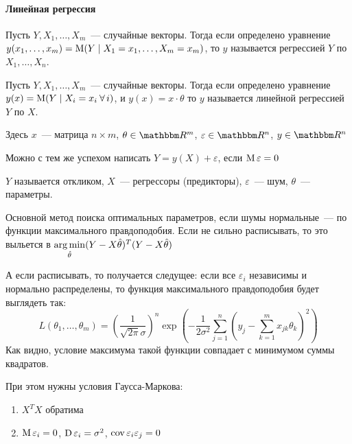 \documentclass[12pt,timbord]{../../../notes}
\begin{document}
\paragraph{Линейная регрессия}
\label{par:stat::regr}


\begin{defn}[Регрессия]\label{defn:stat::regr::reg}
  Пусть $Y, X_1, \dotsc, X_m$~--- случайные векторы. 
  Тогда если определено уравнение $y(x_1, \dotsc, x_m) = \operatorname{M} (Y \mid X_1 = x_1, \dotsc, X_m =
  x_m)$,  то $y$ называется регрессией $Y$ по $X_1, \dotsc, X_n$.
\end{defn}

\begin{defn}\label{defn:stat::regr::lin}
  Пусть $Y, X_1, \dotsc, X_m$~--- случайные векторы. 
  Тогда если определено уравнение $y(x) = \operatorname{M} (Y \mid X_i =  x_i \:\forall\, i)$, 
  и $y(x) = x\cdot\theta $ то $y$ называется линейной регрессией $Y$ по $X$.

  Здесь $x$~--- матрица $n\times m$, $\theta\in \R^m$, $\varepsilon\in \R^n$, $y\in \R^n$
\end{defn}
\begin{rem}\label{rem:stat::regr::funran}
  Можно с тем же успехом написать $Y = y(X)+ \varepsilon$, если $\operatorname{M} \varepsilon =0$
\end{rem}

\begin{defn}\label{defn:stat::reg::memb}
  $Y$ называется откликом, $X$~--- регрессоры (предикторы), $\varepsilon$~--- шум, $\theta$~---
  параметры.
\end{defn}

Основной метод поиска оптимальных параметров, если шумы нормальные~--- по  функции максимального правдоподобия.
Если не сильно расписывать, то это выльется в $\operatorname*{arg\,min}\limits_{\hat\theta} (Y-X\hat\theta)^T(Y-X\hat\theta)$

\begin{itaux}
  А если расписывать, то получается следущее: если все $\varepsilon_i$ независимы и нормально
  распределены, то функция максимального правдоподобия  будет выглядеть так:\[
    L(\theta_1, \dotsc, \theta_m) = \left( \frac{1}{\sqrt{2\pi} \sigma} \right)^n
    \exp \left(
      -\frac{1}{2\sigma^2}\sum_{j=1}^n\left(y_j-\textstyle\sum_{k=1}^m x_{jk}\theta_k \right)^2
    \right)
  \]
  Как видно, условие максимума такой функции совпадает с минимумом суммы квадратов.
\end{itaux}

При этом нужны условия Гаусса-Маркова:
\begin{enumerate}
  \item $X^TX$ обратима
  \item $\operatorname{M} \varepsilon_i  = 0$, $\operatorname{D} \varepsilon_i = \sigma^2$, $\operatorname{cov} \varepsilon_i \varepsilon_j = 0$
\end{enumerate}
\end{document}
